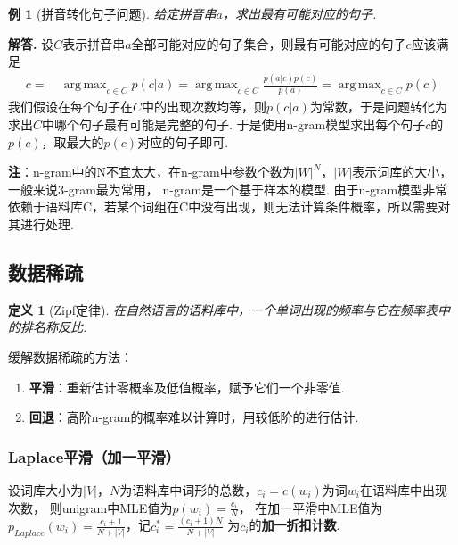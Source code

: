 \documentclass[12pt, a4paper, oneside]{ctexart}
\newtheorem{example}{例}            %
\newtheorem{definition}{定义}
\numberwithin{equation}{section}  %
\newenvironment{solution}[1][]{\par\noindent\textbf{#1解答. }}{\smallskip\par}  %
\DeclareMathOperator*{\argmax}{arg\,max}  %
\def\add{\vspace{1ex}}      %
\begin{document}
\begin{example}[拼音转化句子问题]
    给定拼音串$a$，求出最有可能对应的句子.
\end{example}
\begin{solution}
设$C$表示拼音串$a$全部可能对应的句子集合，则最有可能对应的句子$c$应该满足
    \begin{align*}
        c =&\ \argmax_{c\in C}p(c|a) = \argmax_{c\in C}\frac{p(a|c)p(c)}{p(a)} = \argmax_{c\in C}p(c)
    \end{align*}
    我们假设在每个句子在$C$中的出现次数均等，则$p(c|a)$为常数，于是问题转化为求出$C$中哪个句子最有可能是完整的句子.
    于是使用n-gram模型求出每个句子$c$的$p(c)$，取最大的$p(c)$对应的句子即可.
\end{solution}
\textbf{注}：n-gram中的N不宜太大，在n-gram中参数个数为$|W|^N$，$|W|$表示词库的大小，一般来说3-gram最为常用，
n-gram是一个基于样本的模型. 由于n-gram模型非常依赖于语料库C，若某个词组在C中没有出现，则无法计算条件概率，所以需要对其进行处理.

\subsection{数据稀疏}
\begin{definition}[Zipf定律]
    在自然语言的语料库中，一个单词出现的频率与它在频率表中的排名称反比.
\end{definition}
缓解数据稀疏的方法：
\begin{enumerate}
    \item \textbf{平滑}：重新估计零概率及低值概率，赋予它们一个非零值.
    \item \textbf{回退}：高阶n-gram的概率难以计算时，用较低阶的进行估计.
\end{enumerate}
\subsubsection{Laplace平滑（加一平滑）}
设词库大小为$|V|$，$N$为语料库中词形的总数，\add $c_i=c(w_i)$为词$w_i$在语料库中出现次数， 
则unigram中MLE值为$p(w_i) = \frac{c_i}{N}$，
在加一平滑中MLE值为$p_{Laplace}(w_i) = \frac{c_i+1}{N+|V|}$，\add 记$c^*_i = \frac{(c_i+1)N}{N+|V|}$
为$c_i$的\textbf{加一折扣计数}.
\end{document}
